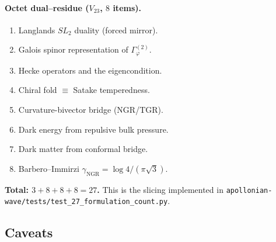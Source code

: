 \documentclass[11pt,a4paper]{article}
\theoremstyle{plain}
\theoremstyle{definition}
\theoremstyle{remark}
\numberwithin{equation}{section}
\providecommand{\vp}{\varphi}
\begin{document}
\paragraph{Octet dual--residue ($V_{23}$, $8$ items).}
\begin{enumerate}[label=\textbf{DR\arabic*.}]
\item Langlands $SL_2$ duality (forced mirror).
\item Galois spinor representation of $\Gamma_\vp^{(2)}$.
\item Hecke operators and the eigencondition.
\item Chiral fold $\equiv$ Satake temperedness.
\item Curvature-bivector bridge (NGR/TGR).
\item Dark energy from repulsive bulk pressure.
\item Dark matter from conformal bridge.
\item Barbero--Immirzi $\gamma_{\text{NGR}} = \log 4 / (\pi\sqrt{3})$.
\end{enumerate}

\textbf{Total: $3 + 8 + 8 + 8 = 27$.}  This is the slicing
implemented in
\texttt{apollonian-wave/tests/test\_27\_formulation\_count.py}.

\subsection{Caveats}
\end{document}
